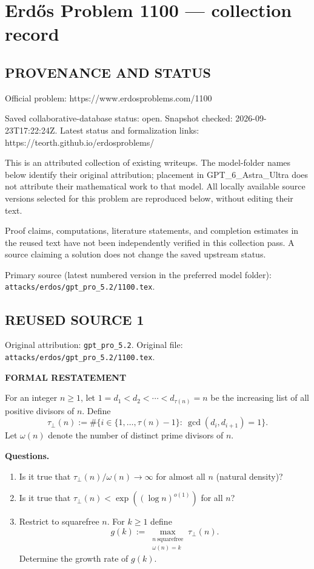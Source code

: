 \section*{Erd\H{o}s Problem 1100 --- collection record}

\subsection*{PROVENANCE AND STATUS}
Official problem: https://www.erdosproblems.com/1100

Saved collaborative-database status: open.
Snapshot checked: 2026-09-23T17:22:24Z.
Latest status and formalization links: https://teorth.github.io/erdosproblems/

This is an attributed collection of existing writeups. The model-folder names below identify their original attribution; placement in GPT\_6\_Astra\_Ultra does not attribute their mathematical work to that model. All locally available source versions selected for this problem are reproduced below, without editing their text.

Proof claims, computations, literature statements, and completion estimates in the reused text have not been independently verified in this collection pass. A source claiming a solution does not change the saved upstream status.

Primary source (latest numbered version in the preferred model folder): \texttt{attacks/erdos/gpt\_pro\_5.2/1100.tex}.

\subsection*{REUSED SOURCE 1}
Original attribution: \texttt{gpt\_pro\_5.2}.
Original file: \texttt{attacks/erdos/gpt\_pro\_5.2/1100.tex}.


\medskip
\noindent\textbf{FORMAL RESTATEMENT}

\smallskip
\noindent
For an integer $n\ge 1$, let $1=d_1<d_2<\cdots<d_{\tau(n)}=n$ be the increasing list of all positive divisors of $n$.
Define
\[
\tau_\perp(n):=\#\{i\in\{1,\dots,\tau(n)-1\}:\ \gcd(d_i,d_{i+1})=1\}.
\]
Let $\omega(n)$ denote the number of distinct prime divisors of $n$.

\smallskip
\noindent
\textbf{Questions.}
\begin{enumerate}
\item Is it true that $\tau_\perp(n)/\omega(n)\to\infty$ for almost all $n$ (natural density)?
\item Is it true that $\tau_\perp(n)<\exp((\log n)^{o(1)})$ for all $n$?
\item Restrict to squarefree $n$. For $k\ge 1$ define
\[
 g(k):=\max_{\substack{n\ \text{squarefree}\\ \omega(n)=k}} \tau_\perp(n).
\]
Determine the growth rate of $g(k)$.
\end{enumerate}

